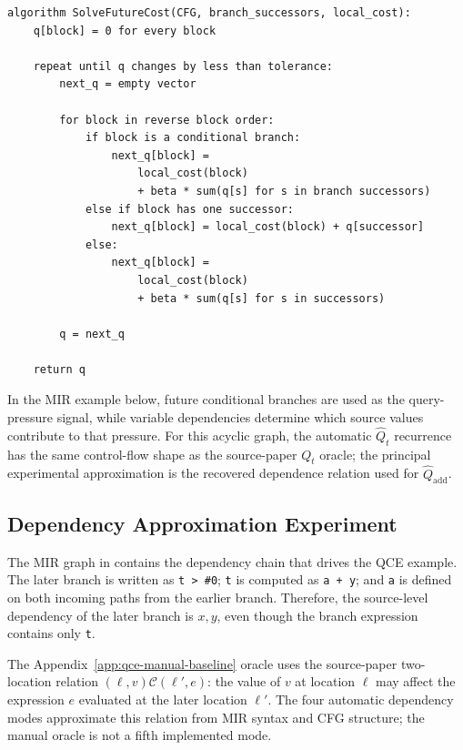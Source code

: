 \documentclass[conference]{IEEEtran}
\begin{document}
\begin{lstlisting}[style=pseudo,caption={Fixed-point propagation used for the hatted MIR estimates.},label={lst:qce-solver}]
algorithm SolveFutureCost(CFG, branch_successors, local_cost):
    q[block] = 0 for every block

    repeat until q changes by less than tolerance:
        next_q = empty vector

        for block in reverse block order:
            if block is a conditional branch:
                next_q[block] =
                    local_cost(block)
                    + beta * sum(q[s] for s in branch successors)
            else if block has one successor:
                next_q[block] = local_cost(block) + q[successor]
            else:
                next_q[block] =
                    local_cost(block)
                    + beta * sum(q[s] for s in successors)

        q = next_q

    return q
\end{lstlisting}

In the MIR example below, future conditional branches are used as the
query-pressure signal, while variable dependencies determine which source
values contribute to that pressure. For this acyclic graph, the automatic
\(\widehat{Q}_t\) recurrence has the same control-flow shape as the
source-paper \(Q_t\) oracle; the principal
experimental approximation is the recovered dependence relation used for
\(\widehat{Q}_{\mathrm{add}}\).

\subsection{Dependency Approximation Experiment}
\label{sec:qce-dependencies}

The MIR graph in  contains the dependency chain that
drives the QCE example. The later branch is written as \texttt{t > \#0};
\texttt{t} is computed as \texttt{a + y}; and \texttt{a} is defined on both
incoming paths from the earlier branch. Therefore, the source-level dependency
of the later branch is \(x,y\), even though the branch expression contains only
\texttt{t}.

The Appendix~\ref{app:qce-manual-baseline} oracle uses the source-paper
two-location relation \((\ell,v)\mathcal C(\ell',e)\): the value of \(v\) at
location \(\ell\) may affect the expression \(e\) evaluated at the later
location \(\ell'\). The four automatic dependency modes approximate this
relation from MIR syntax and CFG structure; the manual oracle is not a fifth
implemented mode.
\end{document}
